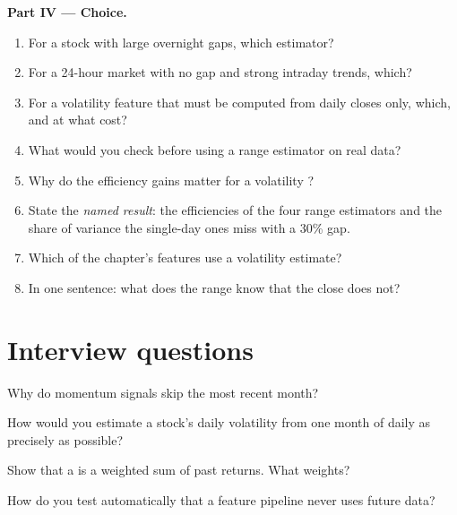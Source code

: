\begin{problem}
\medskip\noindent\textbf{Part IV --- Choice.}
\begin{enumerate}[resume]
\item For a stock with large overnight gaps, which estimator?
\item For a 24-hour market with no gap and strong intraday trends, which?
\item For a volatility feature that must be computed from daily closes only, which, and at what cost?
\item What would you check before using a range estimator on real data?
\item Why do the efficiency gains matter for a volatility ?
\item State the \emph{named result}: the efficiencies of the four range estimators and the share of variance the single-day ones miss
with a 30\% gap.
\item Which of the chapter's features use a volatility estimate?
\item In one sentence: what does the range know that the close does not?
\end{enumerate}
\end{problem}

\section{Interview questions}

\begin{interviewq}\label{iq:rs:price-and-volume-features:1}
Why do momentum signals skip the most recent month?
\end{interviewq}

\begin{interviewq}\label{iq:rs:price-and-volume-features:2}
How would you estimate a stock's daily volatility from one month of daily  as precisely as possible?
\end{interviewq}

\begin{interviewq}\label{iq:rs:price-and-volume-features:3}
Show that a  is a weighted sum of past returns. What weights?
\end{interviewq}

\begin{interviewq}\label{iq:rs:price-and-volume-features:4}
How do you test automatically that a feature pipeline never uses future data?
\end{interviewq}

